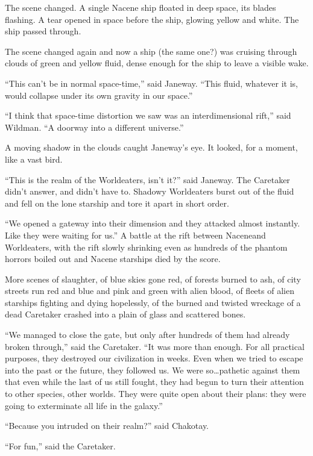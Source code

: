 \documentclass[twoside,letterpaper,12pt]{memoir}
\begin{document}
The scene changed. A single Nacene ship floated in deep space, its blades flashing. A tear opened in space before the ship, glowing yellow and white. The ship passed through. 

The scene changed again and now a ship (the same one?) was cruising through clouds of green and yellow fluid, dense enough for the ship to leave a visible wake. 

``This can't be in normal space-time,'' said Janeway. ``This fluid, whatever it is, would collapse under its own gravity in our space.'' 

``I think that space-time distortion we saw was an interdimensional rift,'' said Wildman. ``A doorway into a different universe.'' 

A moving shadow in the clouds caught Janeway's eye. It looked, for a moment, like a vast bird. 

``This is the realm of the Worldeaters, isn't it?'' said Janeway. The Caretaker didn't answer, and didn't have to. Shadowy Worldeaters burst out of the fluid and fell on the lone starship and tore it apart in short order. 

``We opened a gateway into their dimension and they attacked almost instantly. Like they were waiting for us.'' A battle at the rift between Naceneand Worldeaters, with the rift slowly shrinking even as hundreds of the phantom horrors boiled out and Nacene starships died by the score. 

More scenes of slaughter, of blue skies gone red, of forests burned to ash, of city streets run red and blue and pink and green with alien blood, of fleets of alien starships fighting and dying hopelessly, of the burned and twisted wreckage of a dead Caretaker crashed into a plain of glass and scattered bones. 

``We managed to close the gate, but only after hundreds of them had already broken through,'' said the Caretaker. ``It was more than enough. For all practical purposes, they destroyed our civilization in weeks. Even when we tried to escape into the past or the future, they followed us. We were so\ldots pathetic against them that even while the last of us still fought, they had begun to turn their attention to other species, other worlds. They were quite open about their plans: they were going to exterminate all life in the galaxy.'' 

``Because you intruded on their realm?'' said Chakotay. 

``For fun,'' said the Caretaker. 
\end{document}
